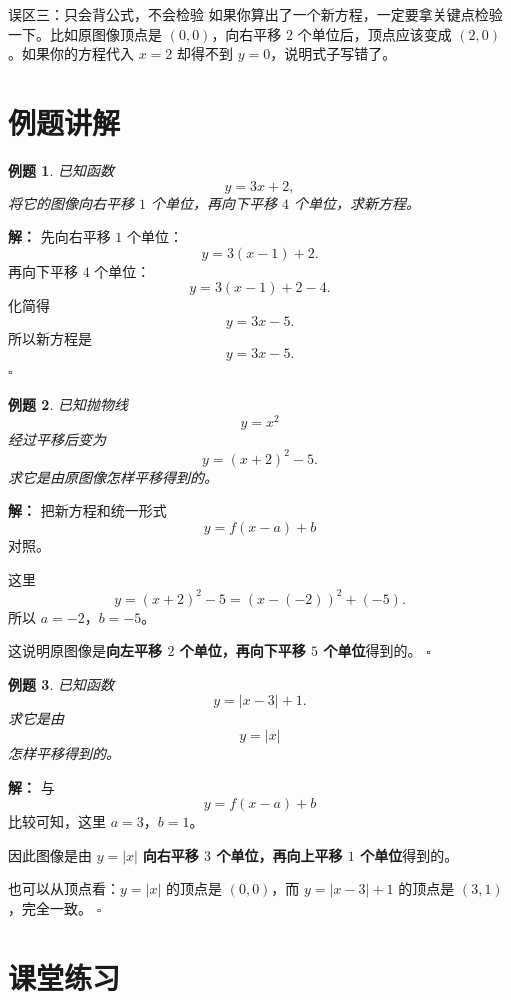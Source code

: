 \documentclass[11pt,a4paper,fontset=fandol]{ctexart}
\theoremstyle{formaltheorem}
\theoremstyle{formalexample}
\newtheorem{example}{例题}[section]
\newenvironment{solution}{\par\noindent\textbf{解：}}{\hfill$\square$\par}
\begin{document}
\begin{notebox}{误区三：只会背公式，不会检验}
如果你算出了一个新方程，一定要拿关键点检验一下。比如原图像顶点是 $(0,0)$，向右平移 $2$ 个单位后，顶点应该变成 $(2,0)$。如果你的方程代入 $x=2$ 却得不到 $y=0$，说明式子写错了。
\end{notebox}

\section{例题讲解}

\begin{example}
已知函数
\[
y=3x+2,
\]
将它的图像向右平移 $1$ 个单位，再向下平移 $4$ 个单位，求新方程。
\end{example}

\begin{solution}
先向右平移 $1$ 个单位：
\[
y=3(x-1)+2.
\]
再向下平移 $4$ 个单位：
\[
y=3(x-1)+2-4.
\]
化简得
\[
y=3x-5.
\]
所以新方程是
\[
\boxed{y=3x-5}.
\]
\end{solution}

\begin{example}
已知抛物线
\[
y=x^2
\]
经过平移后变为
\[
y=(x+2)^2-5.
\]
求它是由原图像怎样平移得到的。
\end{example}

\begin{solution}
把新方程和统一形式
\[
y=f(x-a)+b
\]
对照。

这里
\[
y=(x+2)^2-5=(x-(-2))^2+(-5).
\]
所以 $a=-2$，$b=-5$。

这说明原图像是\textbf{向左平移 $2$ 个单位，再向下平移 $5$ 个单位}得到的。
\end{solution}

\begin{example}
已知函数
\[
y=|x-3|+1.
\]
求它是由
\[
y=|x|
\]
怎样平移得到的。
\end{example}

\begin{solution}
与
\[
y=f(x-a)+b
\]
比较可知，这里 $a=3$，$b=1$。

因此图像是由 $y=|x|$ \textbf{向右平移 $3$ 个单位，再向上平移 $1$ 个单位}得到的。

也可以从顶点看：$y=|x|$ 的顶点是 $(0,0)$，而 $y=|x-3|+1$ 的顶点是 $(3,1)$，完全一致。
\end{solution}

\section{课堂练习}
\end{document}
